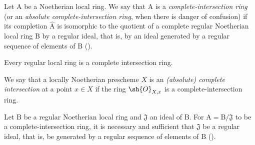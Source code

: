 \begin{definition}[19.3.1]
\label{IV.19.3.1}
Let $\mathrm{A}$ be a Noetherian local ring.
We say that $\mathrm{A}$ is a \emph{complete-intersection ring} (or an \emph{absolute complete-intersection ring}, when there is danger of confusion) if its completion $\widehat{\mathrm{A}}$ is isomorphic to the quotient of a complete regular Noetherian local ring $\mathrm{B}$ by a regular ideal, that is, by an ideal generated by a regular sequence of elements of $\mathrm{B}$ ().

Every regular local ring is a complete intersection ring.

We say that a locally Noetherian prescheme $X$ is an \emph{(absolute) complete intersection} at a point $x\in X$ if the ring $\sh{O}_{X,x}$ is a complete-intersection ring.
\end{definition}

\begin{proposition}[19.3.2]
\label{IV.19.3.2}
Let $\mathrm{B}$ be a regular Noetherian local ring and $\mathfrak{J}$ an ideal of $\mathrm{B}$.
For $\mathrm{A}=\mathrm{B}/\mathfrak{J}$ to be a complete-intersection ring, it is necessary and sufficient that $\mathfrak{J}$ be a regular ideal, that is, be generated by a regular sequence of elements of $\mathrm{B}$ ().
\end{proposition}

